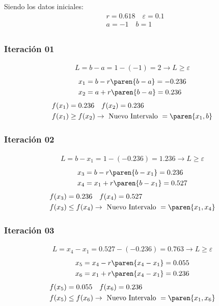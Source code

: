 \begin{homeworkProblem}
Siendo los datos iniciales:
\begin{align*}
    &r=0.618\quad \varepsilon = 0.1 \\
    &a=-1\quad  b=1\\
\end{align*}

\subsubsection{Iteración 01}
\begin{align*}
    L=b-a=1-(-1)=2 \rightarrow L \geq \varepsilon
\end{align*}
\begin{align*}
    &x_1=b - r\paren{b-a}= -0.236 \\
    &x_2=a + r\paren{b-a}= 0.236 
\end{align*}
\begin{align*}
    &f(x_1)=0.236 \quad f(x_2)=0.236 \\
    &f(x_1) \geq f(x_2) \rightarrow \text{ Nuevo Intervalo } = \paren{x_1,b}
\end{align*}


\subsubsection{Iteración 02}
\begin{align*}
    L=b-x_1=1-(-0.236)=1.236 \rightarrow L \geq \varepsilon
\end{align*}
\begin{align*}
    &x_3=b - r\paren{b-x_1}= 0.236\\
    &x_4=x_1 + r\paren{b-x_1}= 0.527
\end{align*}
\begin{align*}
    &f(x_3)=0.236 \quad f(x_4)=0.527 \\
    &f(x_3) \leq f(x_4) \rightarrow \text{ Nuevo Intervalo } = \paren{x_1,x_4}
\end{align*}


\subsubsection{Iteración 03}
\begin{align*}
    L=x_4-x_1=0.527-(-0.236)=0.763 \rightarrow L \geq \varepsilon
\end{align*}
\begin{align*}
    &x_5=x_4 - r\paren{x_4-x_1}= 0.055 \\
    &x_6=x_1 + r\paren{x_4-x_1}= 0.236
\end{align*}
\begin{align*}
    &f(x_5)=0.055 \quad f(x_6)=0.236 \\
    &f(x_5) \leq f(x_6) \rightarrow \text{ Nuevo Intervalo } = \paren{x_1,x_6}
\end{align*}


\end{homeworkProblem}
